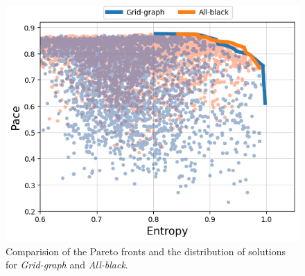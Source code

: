 \begin{figure}[hbtp]
\centering
\includegraphics[scale=1]{Images/images/experiment_diff/fitness_diff.png}
\caption{Comparision of the Pareto fronts and the distribution of solutions for \textit{Grid-graph} and \textit{All-black}.}
\label{fig:ex_diff_pareto_fronts}
\end{figure}
